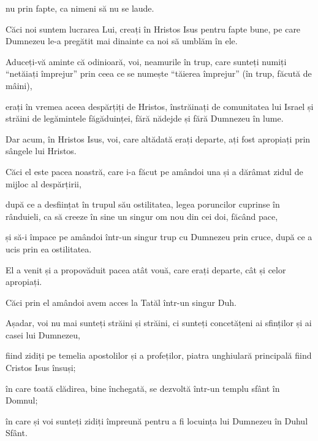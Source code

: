 {nu prin fapte, ca nimeni să nu se laude.

Căci noi suntem lucrarea Lui, creați în Hristos Isus pentru fapte bune, pe care Dumnezeu le-a pregătit mai dinainte ca noi să umblăm în ele.


\par }{\PP {}Aduceți-vă aminte că odinioară, voi, neamurile în trup, care sunteți numiți “netăiați împrejur” prin ceea ce se numește “tăierea împrejur” (în trup, făcută de mâini),

erați în vremea aceea despărțiți de Hristos, înstrăinați de comunitatea lui Israel și străini de legămintele făgăduinței, fără nădejde și fără Dumnezeu în lume.

Dar acum, în Hristos Isus, voi, care altădată erați departe, ați fost apropiați prin sângele lui Hristos.

Căci el este pacea noastră, care i-a făcut pe amândoi una și a dărâmat zidul de mijloc al despărțirii,

după ce a desființat în trupul său ostilitatea, legea poruncilor cuprinse în rânduieli, ca să creeze în sine un singur om nou din cei doi, făcând pace,

și să-i împace pe amândoi într-un singur trup cu Dumnezeu prin cruce, după ce a ucis prin ea ostilitatea.

El a venit și a propovăduit pacea atât vouă, care erați departe, cât și celor apropiați.

Căci prin el amândoi avem acces la Tatăl într-un singur Duh.

Așadar, voi nu mai sunteți străini și străini, ci sunteți concetățeni ai sfinților și ai casei lui Dumnezeu,

fiind zidiți pe temelia apostolilor și a profeților, piatra unghiulară principală fiind Cristos Isus însuși;

în care toată clădirea, bine închegată, se dezvoltă într-un templu sfânt în Domnul;

în care și voi sunteți zidiți împreună pentru a fi locuința lui Dumnezeu în Duhul Sfânt.



\par }
